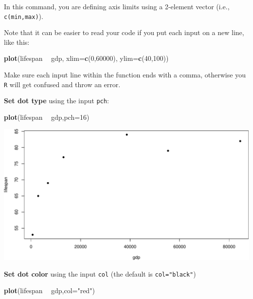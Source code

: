 \documentclass[
]{book}
\newenvironment{Shaded}{\begin{snugshade}}{\end{snugshade}}
\newcommand{\DataTypeTok}[1]{\textcolor[rgb]{0.13,0.29,0.53}{#1}}
\newcommand{\DecValTok}[1]{\textcolor[rgb]{0.00,0.00,0.81}{#1}}
\newcommand{\KeywordTok}[1]{\textcolor[rgb]{0.13,0.29,0.53}{\textbf{#1}}}
\newcommand{\NormalTok}[1]{#1}
\newcommand{\OperatorTok}[1]{\textcolor[rgb]{0.81,0.36,0.00}{\textbf{#1}}}
\newcommand{\StringTok}[1]{\textcolor[rgb]{0.31,0.60,0.02}{#1}}
\begin{document}
In this command, you are defining axis limits using a 2-element vector (i.e., \texttt{c(min,max)}).

Note that it can be easier to read your code if you put each input on a new line, like this:

\begin{Shaded}
\begin{Highlighting}[]
\KeywordTok{plot}\NormalTok{(lifespan }\OperatorTok{~}\StringTok{ }\NormalTok{gdp,}
     \DataTypeTok{xlim=}\KeywordTok{c}\NormalTok{(}\DecValTok{0}\NormalTok{,}\DecValTok{60000}\NormalTok{),}
     \DataTypeTok{ylim=}\KeywordTok{c}\NormalTok{(}\DecValTok{40}\NormalTok{,}\DecValTok{100}\NormalTok{))}
\end{Highlighting}
\end{Shaded}

Make sure each input line within the function ends with a comma, otherwise you \texttt{R} will get confused and throw an error.

\textbf{Set dot type} using the input \texttt{pch}:

\begin{Shaded}
\begin{Highlighting}[]
\KeywordTok{plot}\NormalTok{(lifespan }\OperatorTok{~}\StringTok{ }\NormalTok{gdp,}\DataTypeTok{pch=}\DecValTok{16}\NormalTok{)}
\end{Highlighting}
\end{Shaded}

\includegraphics{figures/unnamed-chunk-103-1.pdf}

\textbf{Set dot color} using the input \texttt{col} (the default is \texttt{col="black"})

\begin{Shaded}
\begin{Highlighting}[]
\KeywordTok{plot}\NormalTok{(lifespan }\OperatorTok{~}\StringTok{ }\NormalTok{gdp,}\DataTypeTok{col=}\StringTok{"red"}\NormalTok{)}
\end{Highlighting}
\end{Shaded}
\end{document}
